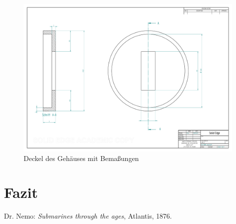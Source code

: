 \documentclass[a4paper,
DIV=13,
12pt,
BCOR=10mm,
department=FakEI,
parskip=half,
automark,
]{article}
\begin{document}
\begin{figure}[!hbpt]
 \begin{center} \includegraphics[width=1.4\textwidth,angle=-90]{Deckel.pdf}
 \caption{Deckel des Gehäuses mit Bemaßungen}
 \label{fig:Deckel}
  \end{center}
\end{figure}

\newpage

\section{Fazit}








\cleardoublepage
\begin{appendix}
\listoffigures

\cleardoublepage
\begin{thebibliography}{99}
 Dr. Nemo: \textit{Submarines through the ages}, Atlantis, 1876.
\end{thebibliography}

\cleardoublepage

\end{appendix}
\end{document}
